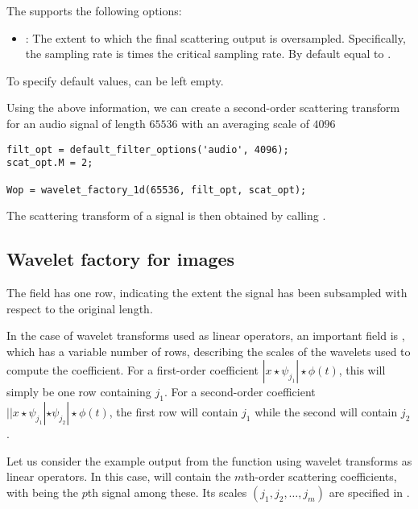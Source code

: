 \documentclass{article}
\begin{document}
The  supports the following options:
\begin{itemize}
	\item {}: The extent to which the final scattering output is oversampled. Specifically, the sampling rate is  times the critical sampling rate. By default equal to .
\end{itemize}
To specify default values,  can be left empty.

Using the above information, we can create a second-order scattering transform for an audio signal of length $65536$ with an averaging scale of $4096$
\begin{lstlisting}
filt_opt = default_filter_options('audio', 4096);
scat_opt.M = 2;

Wop = wavelet_factory_1d(65536, filt_opt, scat_opt);
\end{lstlisting}
The scattering transform of a signal  is then obtained by calling .

\subsection{Wavelet factory for images}

The  field has one row, indicating the extent the signal has been subsampled with respect to the original length.

In the case of wavelet transforms used as linear operators, an important field is , which has a variable number of rows, describing the scales of the wavelets used to compute the coefficient. For a first-order coefficient $|x\star\psi_{j_1}|\star\phi(t)$, this will simply be one row containing $j_1$. For a second-order coefficient $||x\star\psi_{j_1}|\star\psi_{j_2}|\star\phi(t)$, the first row will contain $j_1$ while the second will contain $j_2$.

Let us consider the example output  from the  function using wavelet transforms as linear operators. In this case,  will contain the $m$th-order scattering coefficients, with  being the $p$th signal among these. Its scales $(j_1,j_2,\ldots,j_m)$ are specified in .
\end{document}
